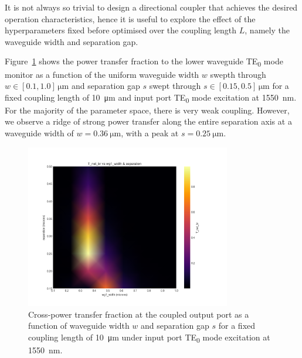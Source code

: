 \documentclass[10pt, a4paper]{article}
\begin{document}
It is not always so trivial to design a directional coupler that achieves the desired operation characteristics,
hence it is useful to explore the effect of the hyperparameters fixed before optimised over the coupling length \(L\),
namely the waveguide width and separation gap.

Figure~\ref{fig:2D_sweep_equal_wg_vs_sep} shows the power transfer fraction to the lower waveguide TE\textsubscript{0} mode monitor
as a function of the uniform waveguide width \(w\) swepth through \(w\in[0.1, 1.0]\,\unit{\um}\) and separation gap \(s\) swept through \(s\in[0.15, 0.5]\,\unit{\um}\) for a fixed coupling length of \SI{10}{\um} and input port TE\textsubscript{0} mode excitation at \SI{1550}{\nm}. For the majority of the parameter space, there is very weak coupling.
However, we observe a ridge of strong power transfer along the entire separation axis at a waveguide width of \(w=\SI{0.36}{\um}\),
with a peak at \(s=\SI{0.25}{\um}\).

\begin{figure}[h!]
  \centering
  \includegraphics[width=0.8\textwidth]{task3/sweep_plots/sweep_idx_2_sweep__wg1_width=0.1_1_8,_wg2_width=0.1_1_8,_separation=0.15_0.5_8_(matched_widths)_T_net_br_heatmap.png}
  \caption{Cross-power transfer fraction at the coupled output port as a function of waveguide width \(w\) and separation gap \(s\) for a fixed coupling length of \SI{10}{\um} under input port TE\textsubscript{0} mode excitation at \SI{1550}{\nm}.}
  \label{fig:2D_sweep_equal_wg_vs_sep}
\end{figure}
\end{document}
